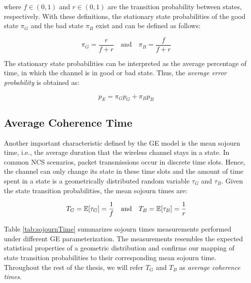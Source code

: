 where $f\in(0,1)$ and $r\in(0,1)$ are the transition probability between states,
respectively. With these definitions, the stationary state probabilities of the
good state $\pi_G$ and the bad state $\pi_B$ exist and can be defined as
follows:

\begin{equation}
  \pi_G = \frac{r}{f+r} \quad \textrm{and} \quad \pi_B = \frac{f}{f+r}
\end{equation}

The stationary state probabilities can be interpreted as the average percentage
of time, in which the channel is in good or bad state. Thus, the \textit{average
error probability} is obtained as:

\begin{equation}
  p_E = \pi_G p_G + \pi_B p_B
  \label{eq:avgLoss}
\end{equation}

\subsection*{Average Coherence Time}
Another important characteristic defined by the GE model is the mean sojourn
time, i.e., the average duration that the wireless channel stays in a state. In
common NCS scenarios, packet transmissions occur in discrete time slots. Hence,
the channel can only change its state in these time slots and the amount of time
spent in a state is a geometrically distributed random variable $\tau_G$ and
$\tau_B$. Given the state transition probabilities, the mean sojourn times are:

\begin{equation}
  T_G = \mathbb{E}[\tau_G] = \frac{1}{f} \quad \textrm{and} \quad T_B = \mathbb{E}[\tau_B] = \frac{1}{r}
\end{equation}

Table \ref{tab:sojournTime} summarizes sojourn times measurements performed
under different GE parameterization. The measurements resembles the expected
statistical properties of a geometric distribution and confirms our mapping of
state transition probabilities to their corresponding mean sojourn time.
Throughout the rest of the thesis, we will refer $T_G$ and $T_B$ as
\textit{average coherence times}.

